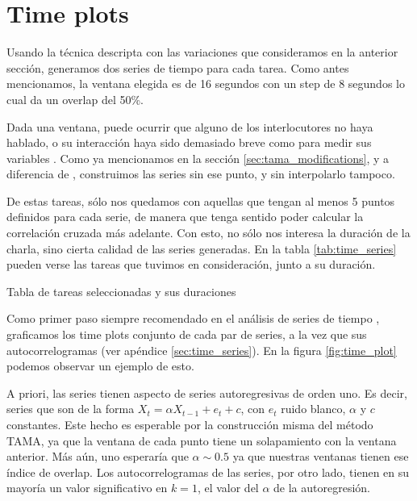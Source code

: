 \section{Time plots}
\label{sec:time_plots}
Usando la técnica descripta con las variaciones que consideramos en la anterior sección, generamos dos series de tiempo para cada tarea. Como antes mencionamos, la ventana elegida es de 16 segundos con un step de 8 segundos lo cual da un overlap del 50\%.

Dada una ventana, puede ocurrir que alguno de los interlocutores no haya hablado, o su interacción haya sido demasiado breve como para medir sus variables \ap. Como ya mencionamos en la sección \ref{sec:tama_modifications}, y a diferencia de \cite{KOU2008.2}, construimos las series sin ese punto, y sin interpolarlo tampoco.

De estas tareas, sólo nos quedamos con aquellas que tengan al menos 5 puntos definidos para cada serie, de manera que tenga sentido poder calcular la correlación cruzada más adelante. Con esto, no sólo nos interesa la duración de la charla, sino cierta calidad de las series generadas. En la tabla \ref{tab:time_series} pueden verse las tareas que tuvimos en consideración, junto a su duración.

\begin{table}
\centering

\caption{Tabla de tareas seleccionadas y sus duraciones}
\label{tab:time_series}
\end{table}


Como primer paso siempre recomendado en el análisis de series de tiempo \cite{CHATFIELD}, graficamos los time plots conjunto de cada par de series, a la vez que sus autocorrelogramas (ver apéndice \ref{sec:time_series}). En la figura \ref{fig:time_plot} podemos observar un ejemplo de esto.

A priori, las series tienen aspecto de series autoregresivas de orden uno. Es decir, series que son de la forma $X_t = \alpha X_{t-1} + e_t + c$, con $e_t$ ruido blanco, $\alpha$ y $c$ constantes. Este hecho es esperable  por la construcción misma del método TAMA, ya que la ventana de cada punto tiene un solapamiento con la ventana anterior. Más aún, uno esperaría que $\alpha \sim 0.5$ ya que nuestras ventanas tienen ese índice de overlap. Los autocorrelogramas de las series, por otro lado, tienen en su mayoría un valor significativo en $k = 1$, el valor del $\alpha$ de la autoregresión.


